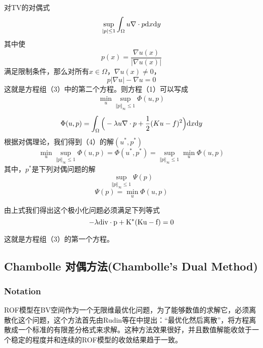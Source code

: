 \documentclass[a4paper,12pt]{article}
\begin{document}
对TV的对偶式
\begin{displaymath}
\sup_{|p|\leq 1}\int_{\Omega}u\nabla\cdot p\mathrm{d} x\mathrm{d} y
\end{displaymath}
其中使
\begin{displaymath}
p(x)=\frac{\nabla u(x)}{|\nabla u(x)|}
\end{displaymath}
满足限制条件，那么对所有$x\in \Omega，\nabla u(x)\neq 0$，
\begin{displaymath}
p|\nabla u|-\nabla u=0
\end{displaymath}
这就是方程组（3）中的第二个方程。则方程（1）可以写成
\begin{eqnarray}
\min_u \sup_{\Vert p\Vert_{\infty}\leq1}\Phi(u,p)
\end{eqnarray}
\begin{displaymath}
\Phi(u,p)=\int_{\Omega}\Big{(}-\lambda u\nabla\cdot p+\frac{1}{2}(Ku-f)^2\Big{)}\mathrm{d} x \mathrm{d} y
\end{displaymath}
根据对偶理论，我们得到（4）的解$(u^*,p^*)$
\begin{displaymath}
\min_u\sup_{\Vert p\Vert_\infty\leq 1}\Phi(u,p)=\Phi(u^*,p^*)=\sup_{\Vert p\Vert_\infty\leq 1}\min_u\Phi(u,p)
\end{displaymath}
其中，$p^*$是下列对偶问题的解
\begin{displaymath}
\sup_{\Vert p\Vert_\infty\leq 1}\Psi (p)
\end{displaymath}
\begin{displaymath}
\Psi (p)=\min_u\Phi(u,p)
\end{displaymath}

由上式我们得出这个极小化问题必须满足下列等式
\begin{displaymath}
-\lambda \rm div\cdot p+K^*(Ku-f)=0
\end{displaymath}

这就是方程组（3）的第一个方程。


\subsection{Chambolle 对偶方法(Chambolle's Dual Method)}

\subsubsection{Notation}
ROF模型在BV空间作为一个无限维最优化问题，为了能够数值的求解它，必须离散化这个问题，这个方法首先由Rudin等在\cite{Rudin:1992ro}中提出：“最优化然后离散”，将方程离散成一个标准的有限差分格式来求解。这种方法效果很好，并且数值解能收敛于一个稳定的程度并和连续的ROF模型的收敛结果趋于一致。
\end{document}
